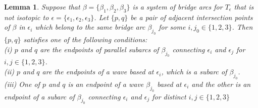 \documentclass[12pt]{amsart}
\newtheorem{Lem}[theorem]{Lemma}
\newcommand{\be}{\beta}
\newcommand{\ep}{\epsilon}
\begin{document}
\begin{Lem}\label{adjacent intersections}
Suppose that $\beta=\{\beta_1,\beta_2,\beta_3\}$ is a system of bridge arcs for $T_{\epsilon}$ that is not isotopic to $\ep=\{\ep_1,\ep_2,\ep_3\}$.
Let $\{p, q\}$ be a pair of adjacent intersection points of $\beta$ in $\ep_{i}$ which belong to the same bridge arc $\be_{j_0}$ for some $i, j_0\in\{1, 2, 3\}$.
Then $\{p, q\}$ satisfies one of the following conditions:\\
(i) $p$ and $q$ are the endpoints of parallel subarcs of $\be_{j_0}$ connecting $\ep_{i}$ and $\ep_j$ for $i, j\in\{1, 2, 3\}$.\\
(ii) $p$ and $q$ are the endpoints of a wave based at $\ep_{i}$, which is a subarc of $\be_{j_0}$.\\
(iii) One of $p$ and $q$ is an endpoint of a wave $\be_{j_0}$ based at $\ep_{i}$ and the other is an endpoint of a subarc of $\be_{j_0}$ connecting $\ep_{i}$ and $\ep_j$ for distinct $i, j\in\{1, 2, 3\}$
\end{Lem}
\end{document}

